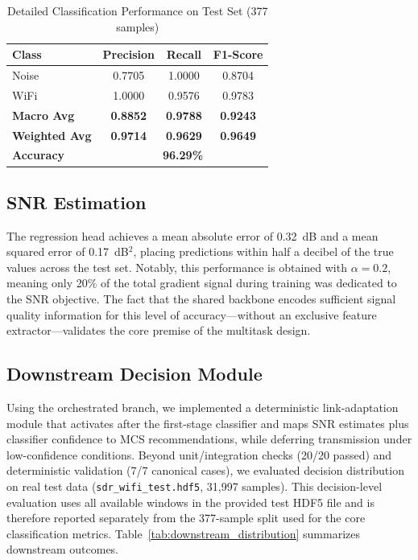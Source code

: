 \documentclass[conference]{IEEEtran}
\begin{document}
\begin{table}[!t]
\centering
\caption{Detailed Classification Performance on Test Set (377 samples)}
\label{tab:classification_results}
\begin{tabular}{@{}lccc@{}}
\toprule
\textbf{Class} & \textbf{Precision} & \textbf{Recall} & \textbf{F1-Score} \\
\midrule
Noise & 0.7705 & 1.0000 & 0.8704 \\
WiFi & 1.0000 & 0.9576 & 0.9783 \\
\midrule
\textbf{Macro Avg} & \textbf{0.8852} & \textbf{0.9788} & \textbf{0.9243} \\
\textbf{Weighted Avg} & \textbf{0.9714} & \textbf{0.9629} & \textbf{0.9649} \\
\textbf{Accuracy} & \multicolumn{3}{c}{\textbf{96.29\%}} \\
\bottomrule
\end{tabular}
\end{table}

\subsection{SNR Estimation}

The regression head achieves a mean absolute error of 0.32~dB and a mean squared error of 0.17~dB$^2$, placing predictions within half a decibel of the true values across the test set. Notably, this performance is obtained with $\alpha = 0.2$, meaning only 20\% of the total gradient signal during training was dedicated to the SNR objective. The fact that the shared backbone encodes sufficient signal quality information for this level of accuracy—without an exclusive feature extractor—validates the core premise of the multitask design.

\subsection{Downstream Decision Module}

Using the orchestrated branch, we implemented a deterministic link-adaptation module that activates after the first-stage classifier and maps SNR estimates plus classifier confidence to MCS recommendations, while deferring transmission under low-confidence conditions. Beyond unit/integration checks (20/20 passed) and deterministic validation (7/7 canonical cases), we evaluated decision distribution on real test data (\texttt{sdr\_wifi\_test.hdf5}, 31,997 samples). This decision-level evaluation uses all available windows in the provided test HDF5 file and is therefore reported separately from the 377-sample split used for the core classification metrics. Table~\ref{tab:downstream_distribution} summarizes downstream outcomes.
\end{document}
